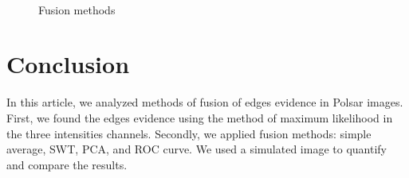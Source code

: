 \documentclass[conference]{IEEEtran}
\begin{document}
\begin{figure}[hbt]
	\centering
     \\
     \caption{Fusion methods}
     \label{fusion_met}
\end{figure}

\section{Conclusion}\label{sec_09}

In this article, we analyzed methods of fusion of edges evidence in Polsar images. 
First, we found the edges evidence using the method of maximum likelihood in the three intensities channels. 
Secondly, we applied fusion methods: simple average, SWT, PCA, and ROC curve. 
We used a simulated image to quantify and compare the results. 
\end{document}
